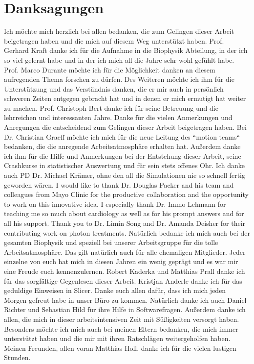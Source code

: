 \documentclass[type=dr, dr=rernat, acm$^3$entcolor=tud7b,colorbacktitle, bigchapter, openright, twoside, 12pt ]{tudthesis}
\begin{document}
\chapter*{Danksagungen}
Ich m\"ochte mich herzlich bei allen bedanken, die zum Gelingen dieser Arbeit beigetragen haben und die mich auf diesem Weg unterst\"utzt haben. 
Prof. Gerhard Kraft danke ich f\"ur die Aufnahme in die Biophysik Abteilung, in der ich so viel gelernt habe und in der ich mich all die Jahre 
sehr wohl gef\"uhlt habe. 
Prof. Marco Durante m\"ochte ich f\"ur die M\"oglichkeit danken an diesem aufregenden Thema forschen zu d\"urfen. 
Des Weiteren m\"ochte ich ihm f\"ur die Unterst\"utzung und das Verst\"andnis danken, die er mir auch in pers\"onlich schweren Zeiten entgegen 
gebracht hat und in denen er mich ermutigt hat weiter zu machen.
Prof. Christoph Bert danke ich f\"ur seine Betreuung und die lehrreichen und interessanten Jahre. Danke f\"ur die 
vielen Anmerkungen und Anregungen die entscheidend zum Gelingen dieser Arbeit beigetragen haben. 
Bei Dr. Christian Graeff m\"ochte ich mich f\"ur die neue Leitung des ``motion teams`` bedanken, die die anregende Arbeitsatmosph\"are 
erhalten hat. Au{\ss}erdem danke ich ihm f\"ur die Hilfe und Anmerkungen bei der Entstehung dieser Arbeit, seine Crashkurse in statistischer 
Auswertung und f\"ur sein stets offenes Ohr. Ich danke auch PD Dr. Michael Kr\"amer, ohne den all die Simulationen nie so schnell fertig geworden w\"aren.\newline
\newline
I would like to thank Dr. Douglas Packer and his team and colleagues from Mayo Clinic for the productive collaboration and the opportunity to work on 
this innovative idea. I especially thank Dr. Immo Lehmann for teaching me so much about cardiology as well as for his prompt answers and for 
all his support. Thank you to Dr. Limin Song and Dr. Amanda Deisher for their contributing work on 
photon treatments. \newline
\newline
Nat\"urlich bedanke ich mich auch bei der gesamten Biophysik und speziell bei unserer Arbeitsgruppe f\"ur die tolle Arbeitsatmosph\"are. 
Das gilt nat\"urlich auch f\"ur alle ehemaligen Mitglieder. Jeder einzelne von euch hat mich in diesen Jahren ein wenig gepr\"agt und es 
war mir eine Freude euch kennenzulernen. 
Robert Kaderka und Matthias Prall danke ich f\"ur das sorgf\"altige Gegenlesen dieser Arbeit. Kristjan Anderle danke ich f\"ur das geduldige 
Einweisen in Slicer. Danke euch allen daf\"ur, dass ich mich jeden Morgen gefreut habe in unser B\"uro zu kommen. 
Nat\"urlich danke ich auch Daniel Richter und Sebastian Hild f\"ur ihre Hilfe in Softwarefragen. Au{\ss}erdem danke ich allen, die mich 
in dieser arbeitsintensiven Zeit mit S\"u{\ss}igkeiten versorgt haben.\newline
\newline
Besonders m\"ochte ich mich auch bei meinen Eltern bedanken, die mich immer unterst\"utzt haben und die mir mit ihren Ratschl\"agen 
weitergeholfen haben. Meinen Freunden, allen voran Matthias Holl, danke ich f\"ur die vielen lustigen Stunden. 
\end{document}
